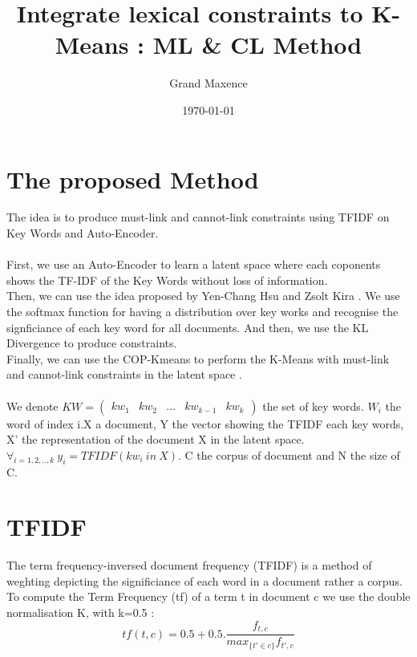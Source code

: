 \documentclass{article}
\title{Integrate lexical constraints to K-Means : ML \& CL Method}
\author{Grand Maxence}
\date{\today}
\begin{document}
\maketitle
\justify

\section{The proposed Method}

The idea is to produce must-link and cannot-link constraints using
TFIDF on Key Words and Auto-Encoder.\\ \\
First, we use an Auto-Encoder to learn a latent
space where each coponents shows the TF-IDF of the Key Words without
loss of information.\\Then, we can use the idea proposed
by Yen-Chang Hsu and Zsolt Kira \cite{2015arXiv151106321H}.
We use the softmax function for having a distribution over key works
and recognise the signficiance of each key word for all documents.
And then, we use the KL Divergence to produce constraints.\\Finally,
we can use the COP-Kmeans to perform the K-Means with must-link and
cannot-link constraints in the latent space
\cite{Wagstaff:2001:CKC:645530.655669} \cite{2016arXiv161004794Y}.
\\ \\
We denote $KW = \begin{pmatrix} kw_1 & kw_2 & ... & kw_{k-1} & kw_{k}
\end {pmatrix}$
the set of key words. $W_i$ the word of index i.X a document,
Y the vector showing the TFIDF each key words, X' the representation of the
document X in the latent space. $\forall_{i=1, 2, .., k}~y_i = TFIDF(kw_i~in~X)$.
C the corpus of document and N the size of C.

\section{TFIDF}

The term frequency-inversed document frequency (TFIDF) is a method of
weghting depicting the significiance of each word in a document rather
a corpus.
\\
To compute the Term Frequency (tf) of a term t in document c we use
the double normalisation K, with k=0.5 :  
\begin{equation}\label{eq:tf}
  tf(t, c) = 0.5 + 0.5.\frac{f_{t,c}}{max_{\{t' \in c \}}f_{t',c}}
\end{equation}
\end{document}
